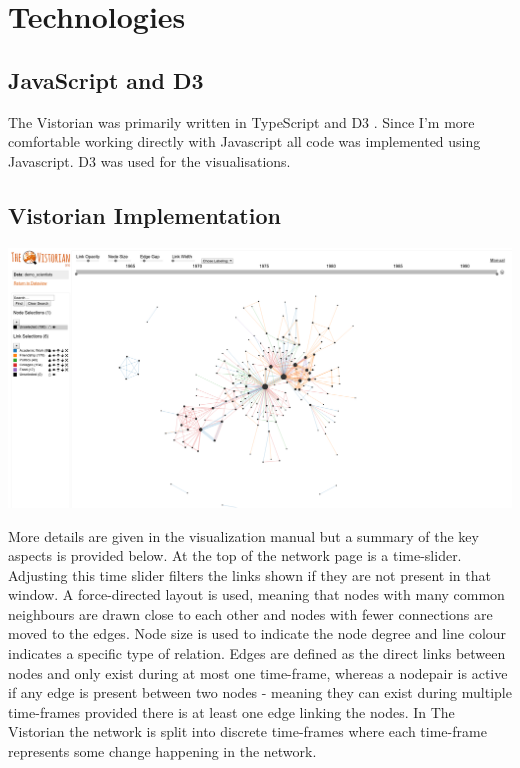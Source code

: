 \section{Technologies}
\subsection{JavaScript and D3}
\label{sec:sec24}
The Vistorian was primarily written in TypeScript and D3 \cite{d3site}. Since I'm more comfortable working directly with Javascript all code was implemented using Javascript. D3 was used for the visualisations.

\subsection{Vistorian Implementation}

\begin{center}
\includegraphics[trim={0 0 0 0}, width=140mm]{./Figures/vistorianOriginal.png}
\end{center}

More details are given in the visualization manual \cite{vismanual} but a summary of the key aspects is provided below.
At the top of the network page is a time-slider. Adjusting this time slider filters the links shown if they are not present in that window. A force-directed layout is used, meaning that nodes with many common neighbours are drawn close to each other and nodes with fewer connections are moved to the edges. Node size is used to indicate the node degree and line colour indicates a specific type of relation. Edges are defined as the direct links between nodes and only exist during at most one time-frame, whereas a nodepair is active if any edge is present between two nodes - meaning they can exist during multiple time-frames provided there is at least one edge linking the nodes. In The Vistorian the network is split into discrete time-frames where each time-frame represents some change happening in the network. 





